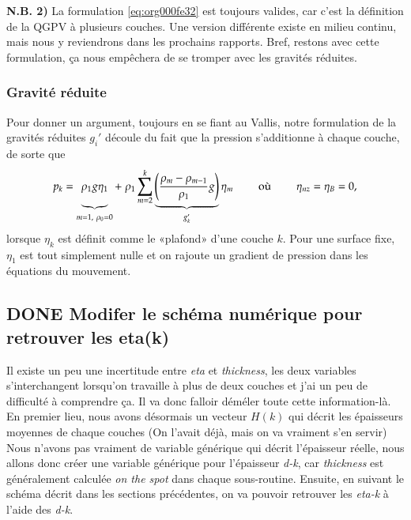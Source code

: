 \documentclass[10pt]{article}
\numberwithin{equation}{section}
\newcommand{\bigno}{\vphantom{\qty(\frac{d}{q})}}
\begin{document}
\textbf{N.B. 2)} La formulation \ref{eq:org000fe32} est toujours valides, car c'est la définition de la QGPV à plusieurs couches.
Une version différente existe en milieu continu, mais nous y reviendrons dans les prochains rapports.
Bref, restons avec cette formulation, ça nous empêchera de se tromper avec les gravités réduites.

\subsubsection{Gravité réduite}
\label{sec:org937efce}

Pour donner un argument, toujours en se fiant au Vallis, notre formulation de la gravités réduites \(g_i'\) découle du fait que la pression s'additionne à chaque couche, de sorte que 
\begin{equation}
p_{k} = \underbrace{\rho_1 g \eta_1\bigno}_{m=1,\ \rho_0=0} + \ \rho_1 \sum_{m=2}^k \underbrace{\qty(\frac{\rho_m - \rho_{m-1}}{\rho_1} g)}_{g_k'} \eta_m
\hspace{0.8cm} \text{où}\hspace{0.8cm}
\eta_{nz} = \eta_B = 0,
\end{equation}
lorsque \(\eta_k\) est définit comme le «plafond» d'une couche \(k\).
Pour une surface fixe, \(\eta_1\) est tout simplement nulle et on rajoute un gradient de pression dans les équations du mouvement.

\subsection{{\bfseries\sffamily DONE} Modifer le schéma numérique pour retrouver les eta(k)}
\label{sec:org90af646}
Il existe un peu une incertitude entre \emph{eta} et \emph{thickness}, les deux variables s'interchangent lorsqu'on travaille à plus de deux couches et j'ai un peu de difficulté à comprendre ça.
Il va donc falloir déméler toute cette information-là.
En premier lieu, nous avons désormais un vecteur \(H(k)\) qui décrit les épaisseurs moyennes de chaque couches (On l'avait déjà, mais on va vraiment s'en servir)
Nous n'avons pas vraiment de variable générique qui décrit l'épaisseur réelle, nous allons donc créer une variable générique pour l'épaisseur \emph{d-k}, car \emph{thickness} est généralement calculée \emph{on the spot} dans chaque sous-routine.
Ensuite, en suivant le schéma décrit dans les sections précédentes, on va pouvoir retrouver les \emph{eta-k} à l'aide des \emph{d-k}.\\[0pt]
\end{document}
